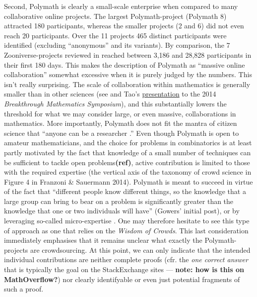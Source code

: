 \documentclass[article, floatfix, groupaddress, prb]{revtex4-1}
\begin{document}
Second, Polymath is clearly a small-scale enterprise when compared to
many collaborative online projects. The largest Polymath-project
(Polymath 8) attracted 180 participants, whereas the smaller projects (2
and 6) did not even reach 20 participants. Over the 11 projects 465
distinct participants were identified (excluding ``anonymous'' and its
variants). By comparison, the 7 Zooniverse-projects reviewed in
\cite{Sauermann Ranzoni 2015} reached between 3,186 and 28,828
participants in their first 180 days. This makes the description of
Polymath as ``massive online collaboration'' somewhat excessive when it
is purely judged by the numbers. This isn't really surprising. The scale
of collaboration within mathematics is generally smaller than in other
sciences (see \cite{grossman2002patterns} and Tao's
\href{https://terrytao.files.wordpress.com/2015/07/polymath.pdf}{presentation}
to the 2014 \emph{Breakthrough Mathematics Symposium}), and this
substantially lowers the threshold for what we may consider large, or
even massive, collaborations in mathematics. More importantly, Polymath
does not fit the mantra of citizen science that ``anyone can be a
researcher .'' Even though Polymath is open to amateur mathematicians,
and the choice for problems in combinatorics is at least partly
motivated by the fact that knowledge of a small number of techniques can
be sufficient to tackle open problems\textbf{(ref)}, active contribution
is limited to those with the required expertise (the vertical axis of
the taxonomy of crowd science in Figure 4 in Franzoni \& Sauermann
2014). Polymath is meant to succeed in virtue of the fact that
``different people know different things, so the knowledge that a large
group can bring to bear on a problem is significantly greater than the
knowledge that one or two individuals will have'' (Gowers' initial
post), or by leveraging so-called micro-expertise
\cite{Nielsen:ReinventingDiscoveryTheNewEraOf:2012}. One may therefore
hesitate to see this type of approach as one that relies on the
\emph{Wisdom of Crowds}. This last consideration immediately emphasises
that it remains unclear what exactly the Polymath-projects are
crowdsourcing. At this point, we can only indicate that the intended
individual contributions are neither complete proofs (cfr. the \emph{one
correct answer} that is typically the goal on the StackExchange sites
--- \textbf{note: how is this on MathOverflow?}) nor clearly
identifyable or even just potential fragments of such a proof.
\end{document}
